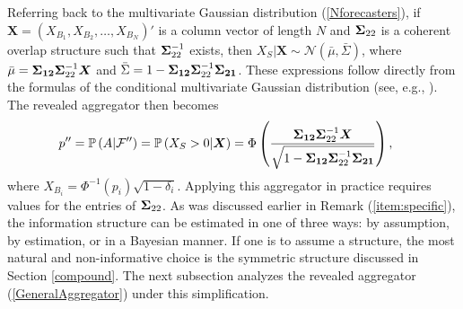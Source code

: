 \documentclass[12pt]{article}
\renewcommand{\P}{\mathbb{P}}
\theoremstyle{definition}
\theoremstyle{definition}
\def\one{\mathbbm{1}}
\def\F{{\cal F}}
\def\P{{\mathbb P}}
\def\probit{p_{\rm probit}}
\begin{document}
Referring back to the multivariate Gaussian distribution
(\ref{Nforecasters}), if $\boldsymbol{X} = (X_{B_1}, X_{B_2}, \dots,
X_{B_N})'$ is a column vector of length $N$ and ${\bf\Sigma}_{22}$ is a
coherent overlap structure such that ${\bf\Sigma}_{22}^{-1}$ exists, then $X_{S} | \boldsymbol{X} \sim \mathcal{N}\left(\bar{\mu}, \bar{\Sigma}\right)$, where $\bar{\mu} 
  = {\bf \Sigma_{12}} {\bf\Sigma}_{22}^{-1} \boldsymbol{X}$ and $\bar{\Sigma} = 1 - {\bf\Sigma_{12}} {\bf\Sigma}_{22}^{-1} {\bf\Sigma_{21}}$. 
%
These expressions follow directly from the formulas of
the conditional multivariate Gaussian distribution (see, 
e.g., \citealt{ravishanker2001first}). 
The revealed aggregator then becomes
\begin{align}
p'' & =  \P\left(A  | \F''\right) =  \P\left(X_{S} > 0 | \boldsymbol{X}\right) = \Phi\left( \frac{{\bf\Sigma_{12}} {\bf\Sigma}_{22}^{-1} \boldsymbol{X}}
   {\sqrt{1 - {\bf\Sigma_{12}} {\bf\Sigma}_{22}^{-1} {\bf\Sigma_{21}}}}\right), 
\label{GeneralAggregator} \,
\end{align}
 where $X_{B_i} =
\Phi^{-1}(p_i)\sqrt{1-\delta_i}$. Applying this aggregator in practice requires values for the entries of ${\bf\Sigma}_{22}$.
As  was discussed earlier in Remark (\ref{item:specific}), the information structure can be estimated in one of three ways: by
assumption, by estimation, or in a Bayesian manner. If one is to
assume a structure, the most natural and non-informative choice is the
symmetric structure discussed in Section \ref{compound}. The next subsection analyzes the revealed aggregator (\ref{GeneralAggregator}) under this simplification.
\end{document}
